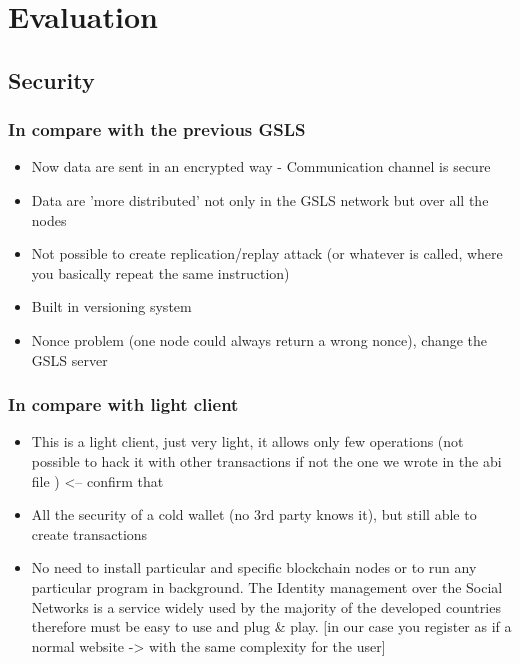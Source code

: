 \section{Evaluation}
\label{S:4}


\subsection{Security}

\subsubsection{In compare with the previous GSLS}

\begin{itemize}
  \item Now data are sent in an encrypted way - Communication channel is secure
  \item Data are 'more distributed' not only in the GSLS network but over all the nodes 
  \item Not possible to create replication/replay attack (or whatever is called, where you basically repeat the same instruction)
  \item Built in versioning system
  \item Nonce problem (one node could always return a wrong nonce), change the GSLS server
\end{itemize}

\subsubsection{In compare with light client}
\begin{itemize}
  \item This is a light client, just very light, it allows only few operations (not possible to hack it with other transactions if not the one we wrote in the abi file ) <-- confirm that
  \item All the security of a cold wallet (no 3rd party knows it), but still able to create transactions
  \item No need to install particular and specific blockchain nodes or to run any particular program in background. The Identity management over the Social Networks is a service widely used by the majority of the developed countries therefore must be easy to use and plug & play. [in our case you register as if a normal website -> with the same complexity for the user]
\end{itemize}
